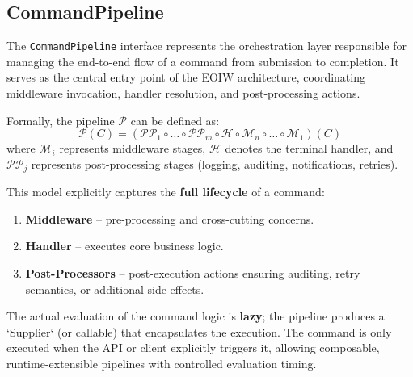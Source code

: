 \subsection{CommandPipeline} 

The \texttt{CommandPipeline} interface represents the orchestration layer responsible for managing 
the end-to-end flow of a command from submission to completion. 
It serves as the central entry point of the EOIW architecture, coordinating middleware invocation, 
handler resolution, and post-processing actions.

Formally, the pipeline $\mathcal{P}$ can be defined as:
\[
\mathcal{P}(C) = (\mathcal{P\!P}_1 \circ \dots \circ \mathcal{P\!P}_m \circ \mathcal{H} \circ \mathcal{M}_n \circ \dots \circ \mathcal{M}_1)(C)
\]
where 
\(\mathcal{M}_i\) represents middleware stages, 
\(\mathcal{H}\) denotes the terminal handler, and 
\(\mathcal{P\!P}_j\) represents post-processing stages (logging, auditing, notifications, retries).

This model explicitly captures the \textbf{full lifecycle} of a command:
\begin{enumerate}
    \item \textbf{Middleware} – pre-processing and cross-cutting concerns.
    \item \textbf{Handler} – executes core business logic.
    \item \textbf{Post-Processors} – post-execution actions ensuring auditing, retry semantics, or additional side effects.
\end{enumerate}

The actual evaluation of the command logic is \textbf{lazy}; the pipeline produces a `Supplier` (or callable) 
that encapsulates the execution. The command is only executed when the API or client explicitly triggers it, 
allowing composable, runtime-extensible pipelines with controlled evaluation timing. 

